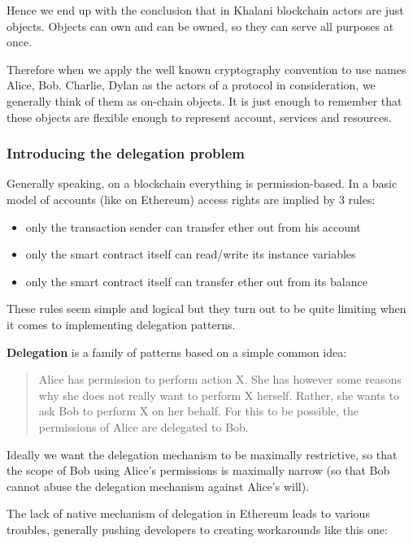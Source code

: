 \documentclass[a4paper]{article}
\begin{document}
Hence we end up with the conclusion that in Khalani blockchain actors are just objects. Objects can own and can be owned, so they can serve all purposes at once. 

Therefore when we apply the well known cryptography convention to use names Alice, Bob. Charlie, Dylan as the actors of a protocol in consideration, we generally think of them as on-chain objects. It is just enough to remember that these objects are flexible enough to represent account, services and resources.

\subsubsection{Introducing the delegation problem}

Generally speaking, on a blockchain everything is permission-based. In a basic model of accounts (like on Ethereum) access rights are implied by 3 rules:

\begin{itemize}
  \item only the transaction sender can transfer ether out from his account
  \item only the smart contract itself can read/write its instance variables
  \item only the smart contract itself can transfer ether out from its balance
\end{itemize}

These rules seem simple and logical but they turn out to be quite limiting when it comes to implementing delegation patterns.

\textbf{Delegation} is a family of patterns based on a simple common idea:

\begin{quotation}
Alice has permission to perform action X. She has however some reasons why she does not really want to perform X herself. Rather, she wants to ask Bob to perform X on her behalf. For this to be possible, the permissions of Alice are delegated to Bob. 
\end{quotation}

Ideally we want the delegation mechanism to be maximally restrictive, so that the scope of Bob using Alice’s permissions is maximally narrow (so that Bob cannot abuse the delegation mechanism against Alice’s will).

The lack of native mechanism of delegation in Ethereum leads to various troubles, generally pushing developers to creating workarounds like this one:
\end{document}
